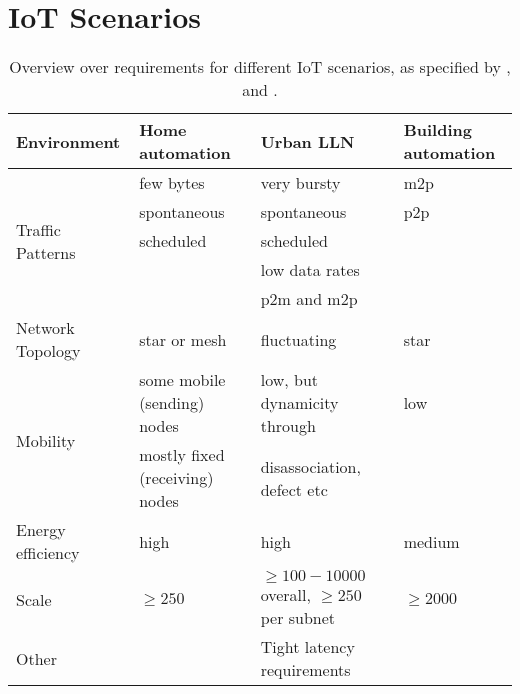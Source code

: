 \documentclass{acm_proc_article-sp}
\begin{document}

\section{IoT Scenarios}
\label{sec:Scenarios}

\begin{table*}[t]
    \begin{tabularx}{\textwidth}{l | X | X | X }
        Environment & \textbf{Home automation} & \textbf{Urban \gls{LLN}} & \textbf{Building automation}\\
        \midrule
        \multirow{5}{*}{Traffic Patterns} & few bytes   & very bursty &  m2p\\
                                          & spontaneous & spontaneous & p2p \\
                                          & scheduled   & scheduled & \\
                                          &             & low data rates & \\
                                          &             & p2m and m2p & \\
        \hline
        Network Topology & star or mesh & fluctuating & star \\
        \hline
        \multirow{2}{*}{Mobility} & some mobile (sending) nodes & low, but dynamicity through & low \\
                                  & mostly fixed (receiving) nodes & disassociation, defect etc &  \\
        \hline
        Energy efficiency & high & high & medium \\
        \hline
        Scale & $\geq 250$ & $\geq 100 - 10000$ overall, $\geq 250$ per subnet & $\geq 2000$ \\
        \hline
        Other && Tight latency requirements &\\
    \end{tabularx}
    \caption{Overview over requirements for different IoT scenarios, as specified by \cite{RFC-5826}, \cite{RFC-5867} and \cite{RFC-5548}.}
    \label{fig:overview}
\end{table*}
\end{document}
